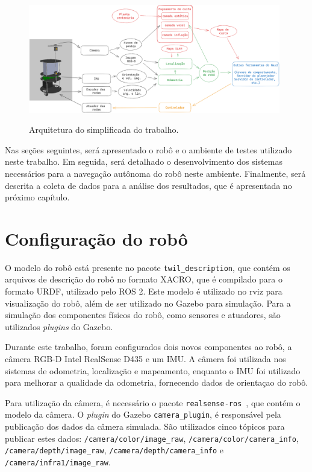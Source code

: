 \documentclass[repeatfields,xlists,xpacks,oneside,yearsonly]{ufrgscca}
\begin{document}
\begin{figure}[h]
    {
        \centering
        \caption{Arquitetura do simplificada do trabalho.}
        \label{fig:arq_trabalho}
        \includegraphics[width=0.98\textwidth]{arquitetura_simplificadav3.png}\\
    }
\end{figure}

Nas seções seguintes, será apresentado o robô e o ambiente de testes
utilizado neste trabalho. Em seguida, será detalhado o
desenvolvimento dos sistemas necessários para a navegação autônoma do
robô neste ambiente. Finalmente, será descrita a coleta de dados para
a análise dos resultados, que é apresentada no próximo capítulo.

\section{Configuração do robô}


O modelo do robô está presente no pacote \texttt{twil\_description},
que contém os arquivos de descrição do robô no formato XACRO, que é
compilado para o formato URDF, utilizado pelo ROS 2. Este modelo é
utilizado no rviz para visualização do robô, além de ser utilizado no
Gazebo para simulação. Para a simulação dos componentes físicos do
robô, como sensores e atuadores, são utilizados \textit{plugins} do
Gazebo.

Durante este trabalho, foram configurados dois novos componentes ao
robô, a câmera RGB-D Intel RealSense D435 e um IMU. A câmera foi
utilizada nos sistemas de odometria, localização e mapeamento,
enquanto o IMU foi utilizado para melhorar a qualidade da odometria,
fornecendo dados de orientaçao do robô.

Para utilização da câmera, é necessário o pacote
\texttt{realsense-ros}~\cite{realsense_ros}, que contém o modelo da
câmera. O \textit{plugin} do Gazebo \texttt{camera\_plugin}, é
responsável pela publicação dos dados da câmera simulada. São
utilizados cinco tópicos para publicar estes dados: 
\texttt{/camera/color/image\_raw},
\texttt{/camera/color/camera\_info},
\texttt{/camera/depth/image\_raw},
\texttt{/camera/depth/camera\_info} e
\texttt{/camera/infra1/image\_raw}.
\end{document}
